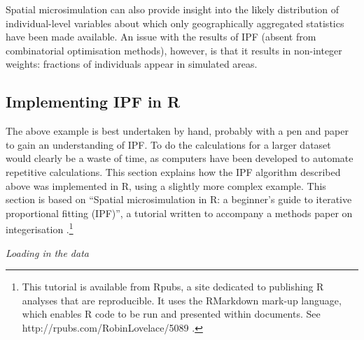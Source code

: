 \documentclass[a4paper,10pt]{article}
\begin{document}
Spatial microsimulation can also provide insight into the likely
distribution of individual-level variables about which only
geographically aggregated statistics have been made available.
An issue
with the results of IPF (absent from combinatorial optimisation methods),
however, is that it results in non-integer weights: fractions of individuals
appear in simulated areas.

\subsection{Implementing IPF in R} \label{simplementing}
The above example is best undertaken by hand, probably with a pen and paper
to gain an understanding of IPF. To do the calculations for a larger
dataset would clearly be a waste of time, as computers have been developed
to automate repetitive calculations. This section explains how the IPF
algorithm described above was implemented in R, using a slightly more
complex example. This section is based on ``Spatial microsimulation in R: a
beginner’s guide to iterative proportional fitting (IPF)'', a tutorial
written to accompany a methods paper on integerisation
\citep{}.\footnote{This tutorial is available from Rpubs, a site dedicated
to publishing R analyses that are reproducible. It uses the RMarkdown
mark-up language, which enables R code to be run and presented within
documents. See http://rpubs.com/RobinLovelace/5089 \label{fnrpub} .}

\emph{Loading in the data}
\end{document}
